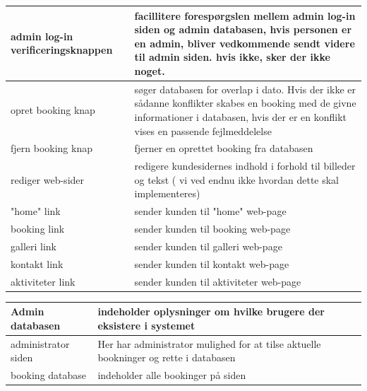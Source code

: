 \documentclass[12pt,a4paper]{article}
\begin{document}
\bigskip

\begin{minipage}{\textwidth}

 \label{tab:title}
\begin{tabular}{| p{5cm} | p{10cm} |}
\hline admin log-in \newline verificeringsknappen & facillitere forespørgslen mellem admin log-in siden og admin databasen, hvis personen er en admin, bliver vedkommende sendt videre til admin siden. hvis ikke, sker der ikke noget.\\
\hline opret booking knap & søger databasen for overlap i dato. Hvis der ikke er sådanne konflikter skabes en booking med de givne informationer i databasen, hvis der er en konflikt vises en passende fejlmeddelelse \\
\hline fjern booking knap & fjerner en oprettet booking fra databasen \\
\hline rediger web-sider & redigere kundesidernes indhold i forhold til billeder og tekst ( vi ved endnu ikke hvordan dette skal implementeres) \\
\hline "home" link & sender kunden til "home" web-page \\
\hline booking link & sender kunden til booking web-page \\
\hline galleri link & sender kunden til galleri web-page \\
\hline kontakt link & sender kunden til kontakt web-page \\
\hline aktiviteter link & sender kunden til aktiviteter web-page \\
\hline
\end{tabular}

\end{minipage}

\bigskip

\begin{minipage}{\textwidth}

 \label{tab:title}
\begin{tabular}{| p{5cm} | p{10cm} |}
\hline Admin databasen & indeholder oplysninger om hvilke brugere der eksistere i systemet \\
\hline administrator siden & Her har administrator mulighed for at tilse aktuelle bookninger og rette i databasen \\
\hline booking database & indeholder alle bookinger på siden \\
\hline
\end{tabular}

\end{minipage}
\end{document}

